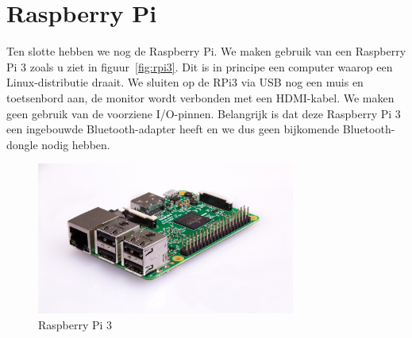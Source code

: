 \section{Raspberry Pi}
Ten slotte hebben we nog de Raspberry Pi. We maken gebruik van een Raspberry Pi 3 zoals u ziet in figuur~\vref{fig:rpi3}. Dit is in principe een computer waarop een Linux-distributie draait. We sluiten op de RPi3 via USB nog een muis en toetsenbord aan, de monitor wordt verbonden met een HDMI-kabel. We maken geen gebruik van de voorziene I/O-pinnen. Belangrijk is dat deze Raspberry Pi 3 een ingebouwde Bluetooth-adapter heeft en we dus geen bijkomende Bluetooth-dongle nodig hebben. 
\begin{figure}[H]
	\centering
	\includegraphics[height=5cm]{rpi3.png}
	\caption{Raspberry Pi 3\label{fig:rpi3}}
\end{figure}
